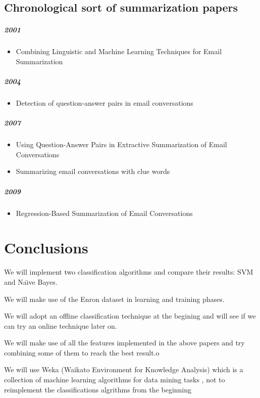 \subsection{Chronological sort of summarization papers}

\subparagraph{2001}
\begin{itemize}
  \item Combining Linguistic and Machine Learning Techniques for Email
Summarization \cite{SMAR01}
\end{itemize}

\subparagraph{2004}
\begin{itemize}
  \item Detection of question-answer pairs in email conversations \cite{LOKESH04}
\end{itemize}

\subparagraph{2007}
\begin{itemize}
  \item Using Question-Answer Pairs in Extractive Summarization of Email Conversations \cite{KATHLEEN07}
  \item Summarizing email conversations with clue words \cite{GIUSEPPE07}
\end{itemize}

\subparagraph{2009}
\begin{itemize}
  \item Regression-Based Summarization of Email Conversations \cite{JAN09}
\end{itemize}

\section{Conclusions}\label{conclusions}
    \begin{my_itemize}
        \item We will implement two classification algorithms and compare their results: SVM and Na\"{\i}ve Bayes.
        \item We will make use of the Enron dataset in learning and training phases.
        \item We will adopt an offline classification technique at the begining and will see if we can try an online technique later on.
        \item We will make use of all the features implemented in the above papers and try combining some of them to reach the best result.o
        \item We will use Weka (Waikato Environment for Knowledge Analysis) which is a collection of machine learning algorithms for data mining tasks , not to reimplement the classifications algrithms from the beginning 

    \end{my_itemize}

